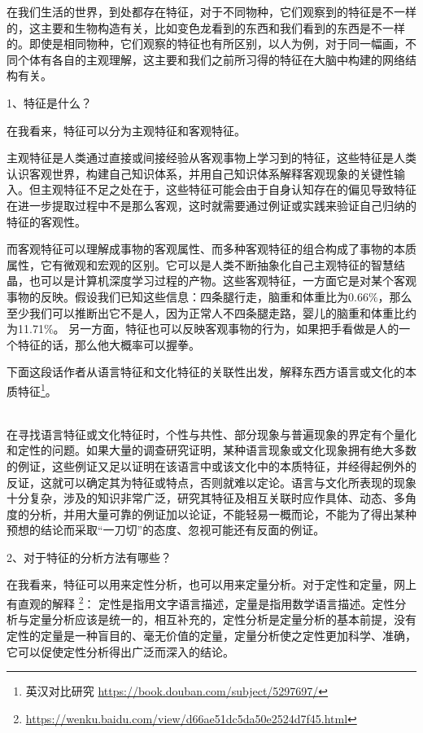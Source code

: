 在我们生活的世界，到处都存在特征，对于不同物种，它们观察到的特征是不一样的，这主要和生物构造有关，比如变色龙看到的东西和我们看到的东西是不一样的。即使是相同物种，它们观察的特征也有所区别，以人为例，对于同一幅画，不同个体有各自的主观理解，这主要和我们之前所习得的特征在大脑中构建的网络结构有关。

1、特征是什么？

在我看来，特征可以分为主观特征和客观特征。

主观特征是人类通过直接或间接经验从客观事物上学习到的特征，这些特征是人类认识客观世界，构建自己知识体系，并用自己知识体系解释客观现象的关键性输入。但主观特征不足之处在于，这些特征可能会由于自身认知存在的偏见导致特征在进一步提取过程中不是那么客观，这时就需要通过例证或实践来验证自己归纳的特征的客观性。

而客观特征可以理解成事物的客观属性、而多种客观特征的组合构成了事物的本质属性，它有微观和宏观的区别。它可以是人类不断抽象化自己主观特征的智慧结晶，也可以是计算机深度学习过程的产物。这些客观特征，一方面它是对某个客观事物的反映。假设我们已知这些信息：四条腿行走，脑重和体重比为0.66$\%$，那么至少我们可以推断出它不是人，因为正常人不四条腿走路，婴儿的脑重和体重比约为11.71$\%$。 另一方面，特征也可以反映客观事物的行为，如果把手看做是人的一个特征的话，那么他大概率可以握拳。

下面这段话作者从语言特征和文化特征的关联性出发，解释东西方语言或文化的本质特征\footnote{英汉对比研究 \quad \url{https://book.douban.com/subject/5297697/}}。

\begin{example}
\\
在寻找语言特征或文化特征时，个性与共性、部分现象与普遍现象的界定有个量化和定性的问题。如果大量的调查研究证明，某种语言现象或文化现象拥有绝大多数的例证，这些例证又足以证明在该语言中或该文化中的本质特征，并经得起例外的反证，这就可以确定其为特征或特点，否则就难以定论。语言与文化所表现的现象十分复杂，涉及的知识非常广泛，研究其特征及相互关联时应作具体、动态、多角度的分析，并用大量可靠的例证加以论证，不能轻易一概而论，不能为了得出某种预想的结论而采取“一刀切”的态度、忽视可能还有反面的例证。
\\
\end{example}


2、对于特征的分析方法有哪些？

在我看来，特征可以用来定性分析，也可以用来定量分析。对于定性和定量，网上有直观的解释
\footnote{\url{https://wenku.baidu.com/view/d66ae51dc5da50e2524d7f45.html}}：
定性是指用文字语言描述，定量是指用数学语言描述。定性分析与定量分析应该是统一的，相互补充的，定性分析是定量分析的基本前提，没有定性的定量是一种盲目的、毫无价值的定量，定量分析使之定性更加科学、准确，它可以促使定性分析得出广泛而深入的结论。

